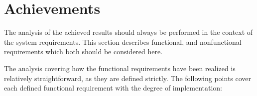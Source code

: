 

%


\section{Achievements}

\label{sec:achievements}

The analysis of the achieved results should always be performed in the context of the system requirements. This section describes functional, and nonfunctional requirements which both should be considered here.

The analysis covering how the functional requirements have been realized is relatively straightforward, as they are defined strictly. The following points cover each defined functional requirement with the degree of implementation:

